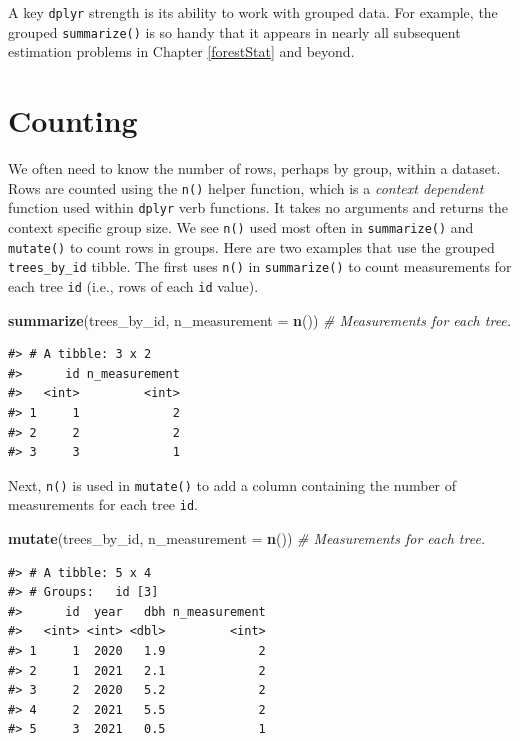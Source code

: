 \documentclass[
  11pt,
]{krantz}
\newenvironment{Shaded}{\begin{snugshade}}{\end{snugshade}}
\newcommand{\CommentTok}[1]{\textcolor[rgb]{0.56,0.35,0.01}{\textit{#1}}}
\newcommand{\DataTypeTok}[1]{\textcolor[rgb]{0.13,0.29,0.53}{#1}}
\newcommand{\KeywordTok}[1]{\textcolor[rgb]{0.13,0.29,0.53}{\textbf{#1}}}
\newcommand{\NormalTok}[1]{#1}
\theoremstyle{definition}
\theoremstyle{definition}
\theoremstyle{definition}
\theoremstyle{definition}
\theoremstyle{remark}
\begin{document}
A key \texttt{dplyr} strength is its ability to work with grouped data. For example, the grouped \texttt{summarize()} is so handy that it appears in nearly all subsequent estimation problems in Chapter \ref{forestStat} and beyond.

\hypertarget{counts}{%
\section{Counting}\label{counts}}

We often need to know the number of rows, perhaps by group, within a dataset. Rows are counted using the \texttt{n()} helper function, which is a \emph{context dependent} function used within \texttt{dplyr} verb functions. It takes no arguments and returns the context specific group size. We see \texttt{n()} used most often in \texttt{summarize()} and \texttt{mutate()} to count rows in groups. Here are two examples that use the grouped \texttt{trees\_by\_id} tibble. The first uses \texttt{n()} in \texttt{summarize()} to count measurements for each tree \texttt{id} (i.e., rows of each \texttt{id} value).

\begin{Shaded}
\begin{Highlighting}[]
\KeywordTok{summarize}\NormalTok{(trees\_by\_id, }
          \DataTypeTok{n\_measurement =} \KeywordTok{n}\NormalTok{()) }\CommentTok{\# Measurements for each tree.}
\end{Highlighting}
\end{Shaded}

\begin{verbatim}
#> # A tibble: 3 x 2
#>      id n_measurement
#>   <int>         <int>
#> 1     1             2
#> 2     2             2
#> 3     3             1
\end{verbatim}

Next, \texttt{n()} is used in \texttt{mutate()} to add a column containing the number of measurements for each tree \texttt{id}.

\begin{Shaded}
\begin{Highlighting}[]
\KeywordTok{mutate}\NormalTok{(trees\_by\_id, }
       \DataTypeTok{n\_measurement =} \KeywordTok{n}\NormalTok{()) }\CommentTok{\# Measurements for each tree.}
\end{Highlighting}
\end{Shaded}

\begin{verbatim}
#> # A tibble: 5 x 4
#> # Groups:   id [3]
#>      id  year   dbh n_measurement
#>   <int> <int> <dbl>         <int>
#> 1     1  2020   1.9             2
#> 2     1  2021   2.1             2
#> 3     2  2020   5.2             2
#> 4     2  2021   5.5             2
#> 5     3  2021   0.5             1
\end{verbatim}
\end{document}

